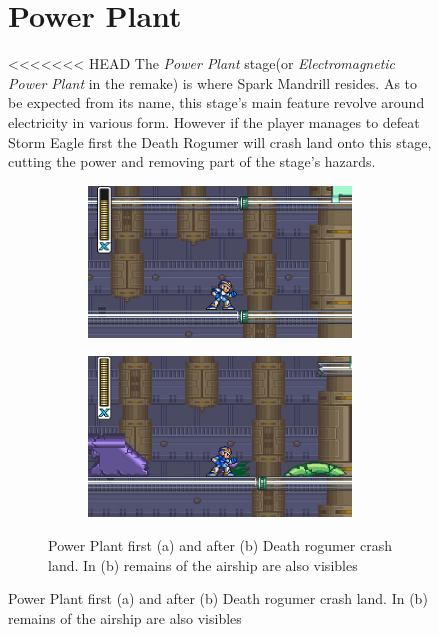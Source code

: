 \begin{figure}[htp]
\section{Power Plant}
<<<<<<< HEAD
The \textit{Power Plant} stage(or \textit{Electromagnetic Power Plant} in the remake) is where Spark Mandrill resides. As to be expected from its name, this stage's main feature revolve around electricity in various form. However if the player manages to defeat Storm Eagle first the Death Rogumer will crash land onto this stage, cutting the power and removing part of the stage's hazards.
\begin{figure}[htp]
	\centering
\begin{subfigure}{0.42\linewidth}
	\centering
	\includegraphics[width=\linewidth]{figures/X1/Spark_mandrill/Mandrill_power.jpg}
	\caption{}
\end{subfigure}
\begin{subfigure}{0.4\linewidth}
	\centering
	\includegraphics[width=\linewidth]{figures/X1/Spark_mandrill/Mandrill_no_power.jpg}
	\caption{}
\end{subfigure}
\caption{Power Plant first (a) and after (b) Death rogumer crash land. In (b) remains of the airship are also visibles}
\end{figure}


\end{figure}
